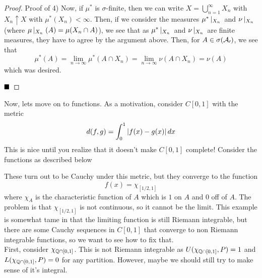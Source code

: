 \begin{proof}{Proof of 4)}
    Now, if $\mu^{*}$ is $\sigma$-finite, then we can write $X = \bigcup_{n = 1}^{\infty} X_n$ with $X_n \uparrow X$ with $\mu^{*}(X_n) < \infty$. Then, if we consider the measures $\mu^{*}\res{X_n}$ and $\nu\res{X_n}$ (where $\mu\res{X_n}(A) = \mu(X_n \cap A)$), we see that as $\mu^{*}\res{X_n}$ and $\nu\res{X_n}$ are finite measures, they have to agree by the argument above. Then, for $A \in \sigma(\cal{A_0})$, we see that
    \[ \mu^{*}(A) = \lim_{n \to \infty} \mu^{*}(A \cap X_n) = \lim_{n \to \infty} \nu(A \cap X_n) = \nu(A) \]
    which was desired. 

    $\qed$
\end{proof}

Now, lets move on to functions. As a motivation, consider $C[0, 1]$ with the metric
\[ d(f, g) = \int_{0}^{1} \abs{f(x) - g(x)}dx \]
This is nice until you realize that it doesn't make $C[0, 1]$ complete! Consider the functions as described below

\begin{center}
\end{center}

These turn out to be Cauchy under this metric, but they converge to the function
\[ f(x) = \chi_{[1/2, 1]} \]
where $\chi_{A}$ is the characteristic function of $A$ which is $1$ on $A$ and $0$ off of $A$. The problem is that $\chi_{[1/2, 1]}$ is not continuous, so it cannot be the limit. This example is somewhat tame in that the limiting function is still Riemann integrable, but there are some Cauchy sequences in $C[0, 1]$ that converge to non Riemann integrable functions, so we want to see how to fix that.\\

First, consider $\chi_{\Q \cap [0, 1]}$. This is not Riemann integrable as $U(\chi_{\Q \cap [0, 1]}, P) = 1$ and $L(\chi_{\Q \cap [0, 1]}, P) = 0$ for any partition. However, maybe we should still try to make sense of it's integral.\\

